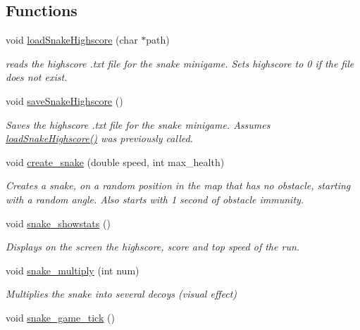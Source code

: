 \subsection*{Functions}
\begin{DoxyCompactItemize}
\item 
void \mbox{\hyperlink{group__snake_gab02c25b496104c83c594be691eb32683}{load\+Snake\+Highscore}} (char $\ast$path)
\begin{DoxyCompactList}\small\item\em reads the highscore .txt file for the snake minigame. Sets highscore to 0 if the file does not exist. \end{DoxyCompactList}\item 
void \mbox{\hyperlink{group__snake_gadc35d1670ccb56645328f13c424977eb}{save\+Snake\+Highscore}} ()
\begin{DoxyCompactList}\small\item\em Saves the highscore .txt file for the snake minigame. Assumes \mbox{\hyperlink{group__snake_gab02c25b496104c83c594be691eb32683}{load\+Snake\+Highscore()}} was previously called. \end{DoxyCompactList}\item 
void \mbox{\hyperlink{group__snake_gadcb5c41dcab72f6e0a7cd5d037c0d744}{create\+\_\+snake}} (double speed, int max\+\_\+health)
\begin{DoxyCompactList}\small\item\em Creates a snake, on a random position in the map that has no obstacle, starting with a random angle. Also starts with 1 second of obstacle immunity. \end{DoxyCompactList}\item 
void \mbox{\hyperlink{group__snake_ga856dc5c649341abaee91d35bafaa92b9}{snake\+\_\+showstats}} ()
\begin{DoxyCompactList}\small\item\em Displays on the screen the highscore, score and top speed of the run. \end{DoxyCompactList}\item 
void \mbox{\hyperlink{group__snake_ga93a5f80b4aa83b0651e9eaa99576140d}{snake\+\_\+multiply}} (int num)
\begin{DoxyCompactList}\small\item\em Multiplies the snake into several decoys (visual effect) \end{DoxyCompactList}\item 
void \mbox{\hyperlink{group__snake_gae59edc17cc6d3f6f1fef0d047304265b}{snake\+\_\+game\+\_\+tick}} ()

\end{DoxyCompactItemize}
